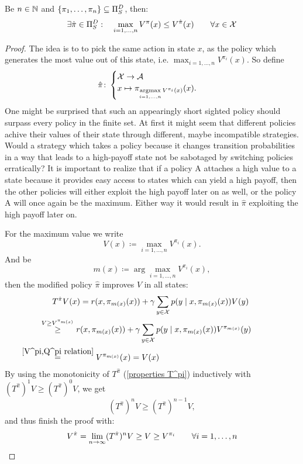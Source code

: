 \begin{prop}\label{finite outmatching}
	Be \(n\in\mathbb{N}\) and \(\{\pi_1,\dots,\pi_n\}\subseteq \Pi_S^D \), then:
	\[\exists \hat{\pi}\in\Pi_S^D: \quad \max_{i=1,\dots,n} V^\pi(x)\le V^{\hat{\pi}}(x) \qquad \forall x\in\mathcal{X} \]
\end{prop}
\begin{proof}
	The idea is to to pick the same action in state \(x\), as the policy which generates the most value out of this state, i.e. \(\max_{i=1,\dots,n}V^{\pi_i}(x)\). So define
	\[
		\hat{\pi}\colon
	\begin{cases} 
		\mathcal{X}\to\mathcal{A}\\
		x\mapsto \pi_{\mathop{\text{argmax}}\limits_{i=1,\dots,n}V^{\pi_i}(x)}(x).
	\end{cases}
	\]
	One might be surprised that such an appearingly short sighted policy should surpass every policy in the finite set. At first it might seem that different policies achive their values of their state through different, maybe incompatible strategies. Would a strategy which takes a policy because it changes transition probabilities in a way that leads to a high-payoff state not be sabotaged by switching policies erratically?
	It is important to realize that if a policy A attaches a high value to a state because it provides easy access to states which can yield a high payoff, then the other policies will either exploit the high payoff later on as well, or the policy A will once again be the maximum. Either way it would result in \(\hat{\pi}\) exploiting the high payoff later on. 

	For the maximum value we write
	\[
		V(x)\coloneqq \max_{i=1,\dots, n}V^{\pi_i}(x).
	\]
	And be 
	\[
		m(x) \coloneqq \arg\max_{i=1,\dots,n}V^{\pi_i}(x),
	\]
	then the modified policy \(\hat{\pi}\) improves \(V\) in all states:
	\begin{align*}
		&T^{\hat{\pi}}V(x)=r(x,\pi_{m(x)}(x))
		+\gamma \sum_{y\in\cX} p(y\mid x,\pi_{m(x)}(x))V(y)\\
		&\lxgq{V\ge V^{\pi_{m(x)}}} r(x,\pi_{m(x)}(x))
		+\gamma \sum_{y\in\cX} p(y\mid x,\pi_{m(x)}(x))V^{\pi_{m(x)}}(y)\\
		&\lxeq{\ref{V^pi,Q^pi relation}} V^{\pi_{m(x)}}(x)=V(x)
	\end{align*}
	By using the monotonicity of \(T^{\hat{\pi}} \) (\ref{properties T^pi}) inductively with \((T^{\hat{\pi}})^1 V \ge (T^{\hat{\pi}})^0 V \), we get
	\[ 
		(T^{\hat{\pi}})^n V \ge (T^{\hat{\pi}})^{n-1} V,
	\]
	and thus finish the proof with:
	\[
		V^{\hat{\pi}} = \lim_{n\to\infty} (T^{\hat{\pi}})^n V 
		\ge V \ge V^{\pi_i}
		\qquad \forall i=1,\dots,n
		\qedhere
	\] 
\end{proof}

